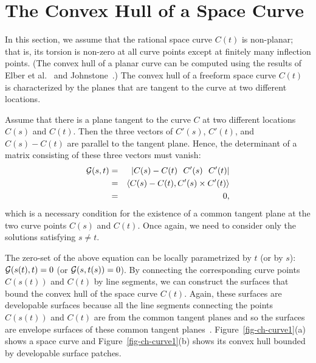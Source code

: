 \documentclass[11pt]{article}          %
\newcommand{\inner}[2]{\left<{#1}, {#2} \right>}
\begin{document}
\section{The Convex Hull of a Space Curve}
\label{sec-space-curve}

In this section, we assume that the rational space curve $C(t)$ is
non-planar; that is, its torsion is non-zero at all curve points
except at finitely many inflection points.
(The convex hull of a planar curve can be computed using the results
of Elber et al.~\cite{Elber2001b} and Johnstone~\cite{Johnstone2001}.)
The convex hull of a freeform space curve $C(t)$ is characterized
by the planes that are tangent to the curve at two different locations.

Assume that there is a plane tangent to the curve $C$ at two different
locations $C(s)$ and $C(t)$.  Then the three vectors of
$C'(s)$, $C'(t)$, and $C(s)-C(t)$ are parallel to the tangent plane.
Hence, the determinant of a matrix consisting of these three vectors 
must vanish:
\begin{eqnarray*}
{\cal G}(s,t) &=& |C(s)-C(t)\ \ C'(s)\ \ C'(t)|\\
&=& \inner{C(s)-C(t)}{C'(s) \times C'(t)}\\
&=& 0,
\end{eqnarray*}
which is a necessary condition for the existence of
a common tangent plane at the two curve points $C(s)$ and $C(t)$.
Once again, we need to consider only the solutions satisfying $s \neq t$.

The zero-set of the above equation can be locally parametrized 
by $t$ (or by $s$): ${\cal G}(s(t),t) = 0$
(or ${\cal G}(s,t(s)) = 0$).
By connecting the corresponding curve points $C(s(t))$ and $C(t)$
by line segments, we can construct the surfaces
that bound the convex hull of the space curve $C(t)$. Again, these
surfaces are developable surfaces because all the line segments 
connecting the points $C(s(t))$ and $C(t)$ are from the common 
tangent planes and so the surfaces are envelope surfaces of these
common tangent planes~\cite{Pottmann}.
Figure~\ref{fig-ch-curve1}(a) shows a space curve and
Figure~\ref{fig-ch-curve1}(b) shows its convex hull bounded by
developable surface patches.
\end{document}

